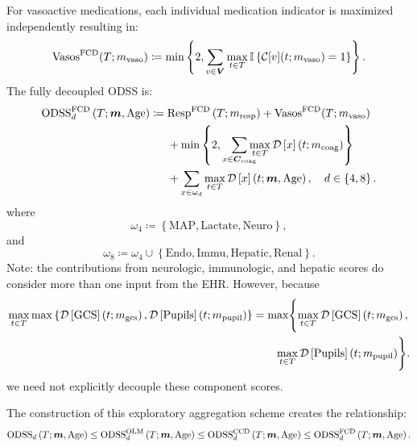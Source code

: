 \documentclass[letterpaper,10pt]{article}
\begin{document}
For vasoactive medications, each individual medication indicator is maximized
independently resulting in:
\begin{equation}
  \label{eq:vasos-fcd}
  \mathrm{Vasos}^{\mathrm{FCD}}(T;m_{\mathrm{vaso}}) \coloneqq
  \min\left\{2, \sum_{v \in \boldsymbol{V}}
  \max_{t \in T} \mathbb{I}\left\{\mathcal{C}[v](t;m_{\mathrm{vaso}}) = 1\right\}
  \right\}.
\end{equation}
The fully decoupled ODSS is:
\begin{equation}
  \label{eq:odss-fcd}
  \begin{aligned}
  \ODSS{d}[FCD] \coloneqq{}&
        \mathrm{Resp}^{\mathrm{FCD}}\left(T;\m{resp}\right) +
        \mathrm{Vasos}^{\mathrm{FCD}}(T;\m{vaso})
    \\
    &+
      \min \left\{ 2, \smashoperator[r]{\sum_{x \in \Ccoag}} \maxtinT \DS*{x}[\m{coag}]\right\}
    \\
    &+
      \sum_{x \in \omega_{d}} \maxtinT \DS*{x}
    , \quad d \in \left\{4, 8\right\}.
  \end{aligned}
\end{equation}
where
\begin{equation}
  \label{eq:omega4-fcd}
  \omega_4 \coloneqq \left\{\mathrm{MAP}, \mathrm{Lactate}, \mathrm{Neuro}\right\},
\end{equation}
and
\begin{equation}
  \label{eq:omega8-fcd}
  \omega_8 \coloneqq \omega_4 \cup \left\{\mathrm{Endo}, \mathrm{Immu}, \mathrm{Hepatic}, \mathrm{Renal}\right\}.
\end{equation}
Note: the contributions from neurologic, immunologic, and hepatic scores do
consider more than one input from the EHR.  However, because
\begin{equation}
  \label{eq:max-of-max-decomposition}
   \begin{aligned}
    \maxtinT
    \max\left\{
      \DS{GCS}[\m{gcs}],
      \DS{Pupils}[\m{pupil}]
    \right\}
    &=
    \max\Biggl\{
      \maxtinT \DS{GCS}[\m{gcs}],
      \\
    &\qquad
      \maxtinT \DS{Pupils}[\m{pupil}]
    \Biggr\}.
  \end{aligned}
\end{equation}
we need not explicitly decouple these component scores.

The construction of this exploratory aggregation scheme creates the relationship:
\begin{equation}
  \label{eq:odss-fcd-bound}
  \ODSS{d} \leq \ODSS{d}[OLM] \leq \ODSS{d}[CCD] \leq \ODSS{d}[FCD].
\end{equation}
\end{document}
